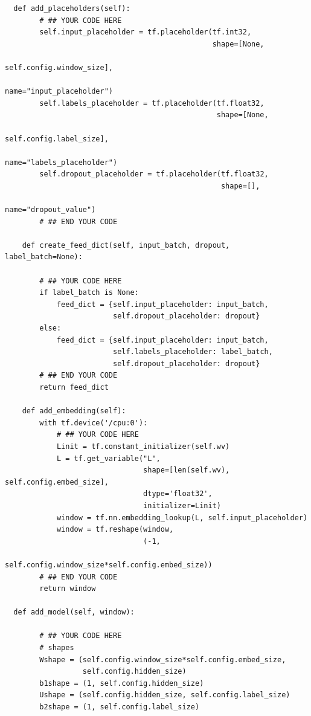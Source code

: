 \documentclass{article}
\begin{document}
\begin{verbatim}
  def add_placeholders(self):
        # ## YOUR CODE HERE
        self.input_placeholder = tf.placeholder(tf.int32,
                                                shape=[None,
                                                       self.config.window_size],
                                                name="input_placeholder")
        self.labels_placeholder = tf.placeholder(tf.float32,
                                                 shape=[None,
                                                        self.config.label_size],
                                                 name="labels_placeholder")
        self.dropout_placeholder = tf.placeholder(tf.float32,
                                                  shape=[],
                                                  name="dropout_value")
        # ## END YOUR CODE

    def create_feed_dict(self, input_batch, dropout, label_batch=None):
        
        # ## YOUR CODE HERE
        if label_batch is None:
            feed_dict = {self.input_placeholder: input_batch,
                         self.dropout_placeholder: dropout}
        else:
            feed_dict = {self.input_placeholder: input_batch,
                         self.labels_placeholder: label_batch,
                         self.dropout_placeholder: dropout}
        # ## END YOUR CODE
        return feed_dict

    def add_embedding(self):
        with tf.device('/cpu:0'):
            # ## YOUR CODE HERE
            Linit = tf.constant_initializer(self.wv)
            L = tf.get_variable("L",
                                shape=[len(self.wv), self.config.embed_size],
                                dtype='float32',
                                initializer=Linit)
            window = tf.nn.embedding_lookup(L, self.input_placeholder)
            window = tf.reshape(window,
                                (-1,
                                 self.config.window_size*self.config.embed_size))
        # ## END YOUR CODE
        return window

  def add_model(self, window):
     
        # ## YOUR CODE HERE
        # shapes
        Wshape = (self.config.window_size*self.config.embed_size,
                  self.config.hidden_size)
        b1shape = (1, self.config.hidden_size)
        Ushape = (self.config.hidden_size, self.config.label_size)
        b2shape = (1, self.config.label_size)


\end{verbatim}
\end{document}
